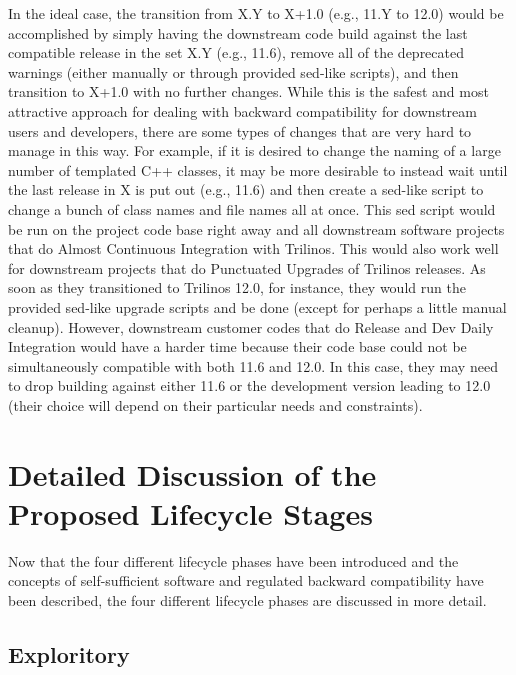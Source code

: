 \documentclass[11pt]{SANDreport}
\begin{document}
In the ideal case, the transition from X.Y to X+1.0 (e.g., 11.Y to
12.0) would be accomplished by simply having the downstream code build
against the last compatible release in the set X.Y (e.g., 11.6),
remove all of the deprecated warnings (either manually or through
provided sed-like scripts), and then transition to X+1.0 with no
further changes.  While this is the safest and most attractive
approach for dealing with backward compatibility for downstream users
and developers, there are some types of changes that are very hard to
manage in this way.  For example, if it is desired to change the
naming of a large number of templated C++ classes, it may be more
desirable to instead wait until the last release in X is put out
(e.g., 11.6) and then create a sed-like script to change a bunch of
class names and file names all at once.  This sed script would be run
on the project code base right away and all downstream software
projects that do Almost Continuous Integration
{}\cite{SoftwareIntegrationforCSE09} with Trilinos.  This would also
work well for downstream projects that do Punctuated Upgrades
{}\cite{SoftwareIntegrationforCSE09} of Trilinos releases.  As soon as
they transitioned to Trilinos 12.0, for instance, they would run the
provided sed-like upgrade scripts and be done (except for perhaps a
little manual cleanup).  However, downstream customer codes that do
Release and Dev Daily Integration {}\cite{SoftwareIntegrationforCSE09}
would have a harder time because their code base could not be
simultaneously compatible with both 11.6 and 12.0.  In this case, they
may need to drop building against either 11.6 or the development
version leading to 12.0 (their choice will depend on their particular
needs and constraints).


%
{}\section{Detailed Discussion of the Proposed Lifecycle Stages}
\label{sec:detained_lifecycle_stages}
%

Now that the four different lifecycle phases have been introduced and
the concepts of self-sufficient software and regulated backward
compatibility have been described, the four different lifecycle phases
are discussed in more detail.


%
{}\subsection{Exploritory}
\label{sec:exploratory_code}
%
\end{document}
